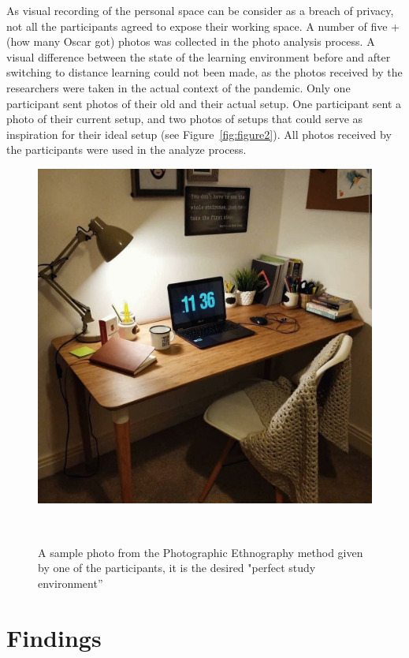 \documentclass{sigchi}
\begin{document}
As visual recording of the personal space can be consider as a breach of privacy, not all the participants agreed to expose their working space. A number of five + (how many Oscar got) photos was collected in the photo analysis process. A visual difference between the state of the learning environment before and after switching to distance learning could not been made, as the photos received by the researchers were taken in the actual context of the pandemic. Only one participant sent photos of their old and their actual setup.  One participant sent a photo of their current setup, and two photos of setups that could serve as inspiration for their ideal setup (see Figure~\ref{fig:figure2}). All photos received by the participants were used in the analyze process.

\begin{figure}
\centering
  \includegraphics[width=1\columnwidth]{figures/perfect-setup}
  \caption{A sample photo from the Photographic Ethnography method given by one of the participants, it is the desired "perfect study environment''}~\label{fig:figure3}
\end{figure}

\section{Findings}
\end{document}
